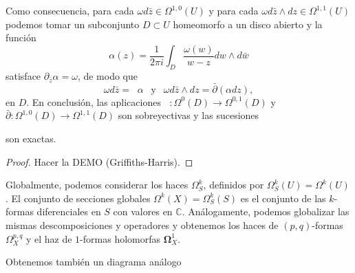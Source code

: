 \documentclass[autocontact]{gaceta}
\theoremstyle{definition} \newtheorem{defn}[thm]{Definición}
\theoremstyle{definition} \newtheorem{ejemplo}[thm]{Ejemplo}
\theoremstyle{definition} \newtheorem{ejercicio}[thm]{Ejercicio}
\def\CC{\mathbb{C}}
\def\OO{\mathscr{O}}
\DeclareMathOperator{\delbar}{\bar{\partial}}
\begin{document}
Como consecuencia, para cada $\omega d\bar{z} \in \Omega^{1,0}(U)$ y para cada $\omega d\bar{z}\wedge dz \in \Omega^{1,1}(U)$ podemos tomar un subconjunto  $D \subset U$ homeomorfo a un disco abierto y la función \begin{equation*}    \alpha(z) = \frac{1}{2\pi i}\int_D \frac{\omega(w)}{w-z} dw \wedge d\bar{w}  \end{equation*}  satisface $\partial_{\bar{z}} \alpha = \omega$, de modo que \begin{equation*}  \omega d\bar{z} = \delbar{\alpha} \ \ \text{ y } \ \   \omega d\bar{z}\wedge dz = \bar{\partial}(\alpha dz),  \end{equation*} en $D$. En conclusión, las aplicaciones $\delbar:\Omega^0(D)\rightarrow \Omega^{0,1}(D)$ y $\bar{\partial}:\Omega^{1,0}(D) \rightarrow \Omega^{1,1}(D)$ son sobreyectivas y las sucesiones  \begin{center}      \end{center}  son exactas.

\begin{proof}
  Hacer la DEMO (Griffiths-Harris).
\end{proof}

Globalmente, podemos considerar los haces $\Omega^k_S$, definidos por $\Omega^k_S(U)=\Omega^k(U)$. El conjunto de secciones globales $\Omega^k(X)=\Omega^k_S(S)$ es el conjunto de las $k$-formas diferenciales en $S$ con valores en $\CC$. Análogamente, podemos globalizar las mismas descomposiciones y operadores y obtenemos los haces de $(p,q)$-formas $\Omega^{p,q}_X$ y el haz de $1$-formas holomorfas $\boldsymbol{\Omega}^1_X$.

Obtenemos también un diagrama análogo

\begin{center}	        \end{center}
\end{document}
